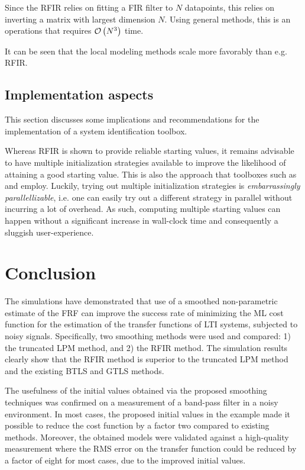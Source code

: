 Since the \gls{RFIR} relies on fitting a \gls{FIR} filter to $N$ datapoints, this relies on inverting a matrix with largest dimension $N$. 
Using general methods, this is an operations that requires $\mathcal{O} \left( N^3 \right)$ time.

It can be seen that the local modeling methods scale more favorably than e.g. \gls{RFIR}.

\subsection{Implementation aspects}
This section discusses some implications and recommendations for the implementation of  a system identification toolbox.

Whereas \gls{RFIR} is shown to provide reliable starting values, it remains advisable to have multiple initialization strategies available to improve the likelihood of attaining a good starting value.
This is also the approach that toolboxes such as \citep{FDIDENT} and \citep{TDIDENT} employ.
Luckily, trying out multiple initialization strategies is \emph{embarrassingly parallellizable}, i.e. one can easily try out a different strategy in parallel without incurring a lot of overhead.
As such, computing multiple starting values can happen without a significant increase in wall-clock time and consequently a sluggish user-experience.

\section{Conclusion}\label{se:Conclusion}
The simulations have demonstrated that use of a smoothed non-parametric estimate of the \gls{FRF} can improve the success rate of minimizing the \gls{ML} cost function for the estimation of the transfer functions of \gls{LTI} systems, subjected to noisy signals. Specifically, two smoothing methods were used and compared: 1) the truncated \gls{LPM} method, and 2) the \gls{RFIR} method. The simulation results clearly show that the \gls{RFIR} method is superior to the truncated \gls{LPM} method and the existing \gls{BTLS} and \gls{GTLS} methods.

The usefulness of the initial values obtained via the proposed smoothing techniques was confirmed on a measurement of a band-pass filter in a noisy environment.
In most cases, the proposed initial values in the example made it possible to reduce the cost function by a factor two compared to existing methods.
Moreover, the obtained models were validated against a high-quality measurement where the \gls{RMS} error on the transfer function could be reduced by a factor of eight for most cases, due to the improved initial values.

